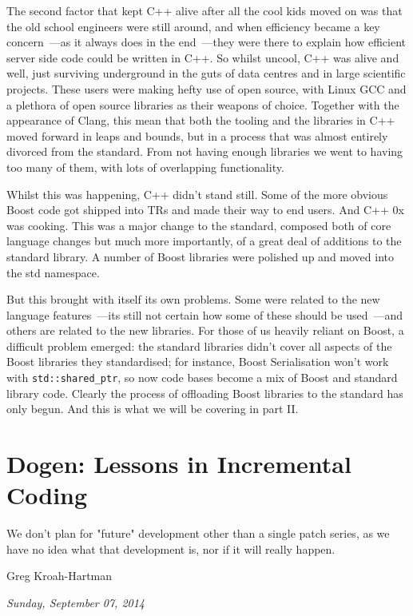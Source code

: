 \documentclass{book}
\begin{document}
The second factor that kept C++ alive after all the cool kids moved on
was that the old school engineers were still around, and when
efficiency became a key concern~---as it always does in the end~---they
were there to explain how efficient server side code could be written
in C++. So whilst uncool, C++ was alive and well, just surviving
underground in the guts of data centres and in large scientific
projects. These users were making hefty use of open source, with Linux
GCC and a plethora of open source libraries as their weapons of
choice. Together with the appearance of Clang, this mean that both the
tooling and the libraries in C++ moved forward in leaps and bounds,
but in a process that was almost entirely divorced from the
standard. From not having enough libraries we went to having too many
of them, with lots of overlapping functionality.

Whilst this was happening, C++ didn't stand still. Some of the more
obvious Boost code got shipped into TRs and made their way to end
users. And C++ 0x was cooking. This was a major change to the
standard, composed both of core language changes but much more
importantly, of a great deal of additions to the standard library. A
number of Boost libraries were polished up and moved into the std
namespace.

But this brought with itself its own problems. Some were related to
the new language features~---its still not certain how some of these
should be used~---and others are related to the new libraries. For
those of us heavily reliant on Boost, a difficult problem emerged: the
standard libraries didn't cover all aspects of the Boost libraries
they standardised; for instance, Boost Serialisation won't work with
\texttt{std::shared\_ptr}, so now code bases become a mix of Boost and
standard library code. Clearly the process of offloading Boost
libraries to the standard has only begun. And this is what we will be
covering in part II.

\chapter{Dogen: Lessons in Incremental Coding}

\epigraph{We don't plan for "future" development other than a single
  patch series, as we have no idea what that development is, nor if it
  will really happen.}{Greg Kroah-Hartman}

\begin{flushright}
  \emph{Sunday, September 07, 2014}
\end{flushright}
\end{document}
